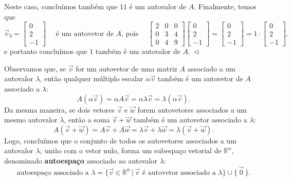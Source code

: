 \begin{ex}
\begin{equation}
	\end{equation} Neste caso, concluímos também que $11$ é um autovalor de $A.$
	Finalmente, temos que 
	\begin{equation}
	\vec{v}_3 =
	{\begin{bmatrix}0\\2\\-1\end{bmatrix}} \quad \text{ é um autovetor de $A$, pois } \quad {\begin{bmatrix}2&0&0\\0&3&4\\0&4&9\end{bmatrix}} {\begin{bmatrix}0\\2\\-1\end{bmatrix}} = {\begin{bmatrix}0\\2\\-1\end{bmatrix}} = 1 \cdot {\begin{bmatrix}0\\2\\-1\end{bmatrix}}.
	\end{equation} e portanto concluímos que $1$ também é  um autovalor de $A. \ \lhd$

\end{ex}




Observamos que, se $\vec{v}$ for um autovetor de uma matriz $A$ associado a um autovalor $\lambda$, então qualquer múltiplo escalar $\alpha \vec{v}$ também é um autovetor de $A$ associado a $\lambda$:
\begin{equation}
A (\alpha \vec{v}) = \alpha A \vec{v} = \alpha \lambda \vec{v} = \lambda (\alpha \vec{v}).
\end{equation} Da mesma maneira, se dois vetores $\vec{v}$ e $\vec{w}$ forem autovetores associados a um mesmo autovalor $\lambda$, então a soma $\vec{v} + \vec{w}$ também é um autovetor associado a $\lambda$:
\begin{equation}
A (\vec{v} + \vec{w}) = A \vec{v} + A \vec{w} =  \lambda \vec{v} + \lambda \vec{w} = \lambda (\vec{v} + \vec{w}).
\end{equation} Logo, concluímos que o conjunto de todos os autovetores associados a um autovalor $\lambda$, união com o vetor nulo, forma um subespaço vetorial de $\mathbb{R}^n$, denominado \textbf{autoespaço} associado ao autovalor $\lambda$:
\begin{equation}
\text{autoespaço associado a } \lambda = \big\{ \vec{v} \in \mathbb{R}^n \, | \, \vec{v} \text{ é autovetor associado a } \lambda \big\} \cup \{\, \vec{0}\, \}.
\end{equation}

